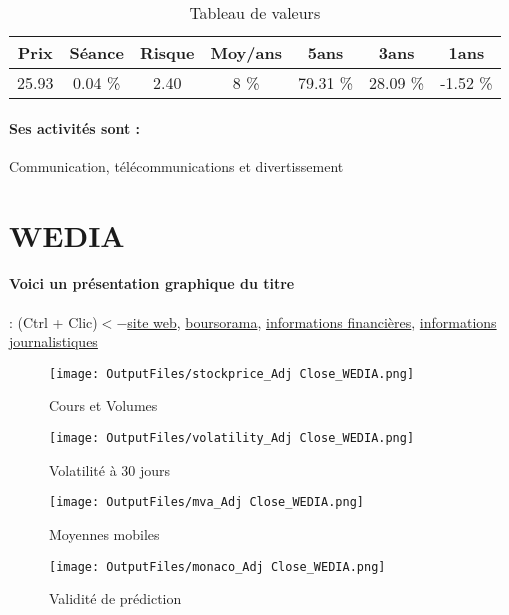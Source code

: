 \documentclass[11pt,a4paper]{report}%
\begin{document}
\begin{table}[H]
  \centering
    \begin{tabular}{|c|c|c|c|c|c|c|}
    \hline
    Prix & Séance & Risque  & Moy/ans & 5ans & 3ans & 1ans \\
    \hline
    25.93 &    0.04 \%    & 2.40 & 8 \% & 79.31 \% & 28.09 \% & -1.52 \% \\
    \hline
    \end{tabular}%
        \label{tab:table_VIVENDI}%
      \caption{Tableau de valeurs}
\end{table}%

\paragraph{Ses activités sont : } Communication, télécommunications et divertissement  
    
    \newpage

\section{WEDIA}

\paragraph{Voici un présentation graphique du titre} : (Ctrl + Clic)$<-$\href{https://www.wedia-group.com/fr/accueil/}{site web}, \href{https://www.boursorama.com/cours/1rPALWED}{boursorama}, \href{https://www.qwant.com/?q=site:https:%2f%2fwww.easybourse.com%2faction-societe%2fWEDIA&t=web&client=ext-firefox-hp}{informations financières}, \href{https://bourse.lerevenu.com/cours-de-bourse/fiche-valeur-synthese/WEDIA/ALWED-FR}{informations journalistiques}
\begin{figure}[!htb]
   \begin{minipage}{0.5\textwidth}
     \centering
     \texttt{[image: OutputFiles/stockprice\_Adj Close\_WEDIA.png]}
     \caption{Cours et Volumes}\label{Fig:price_WEDIA}
   \end{minipage}\hfill
   \begin{minipage}{0.5\textwidth}
     \centering
     \texttt{[image: OutputFiles/volatility\_Adj Close\_WEDIA.png]}
     \caption{Volatilité à 30 jours}\label{Fig:volat_WEDIA}
   \end{minipage}
\end{figure}
\begin{figure}[!htb]
   \begin{minipage}{0.5\textwidth}
     \centering
     \texttt{[image: OutputFiles/mva\_Adj Close\_WEDIA.png]}
     \caption{Moyennes mobiles}\label{Fig:mva_WEDIA}
   \end{minipage}\hfill
   \begin{minipage}{0.5\textwidth}
     \centering
     \texttt{[image: OutputFiles/monaco\_Adj Close\_WEDIA.png]}
     \caption{Validité de prédiction}\label{Fig:prediction_WEDIA}
   \end{minipage}
\end{figure}
\end{document}
